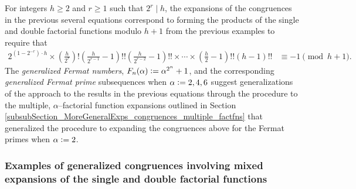 \documentclass[12pt,reqno]{article}
\numberwithin{sfootnote}{section}
\numberwithin{equation}{section}
\theoremstyle{DefaultTheoremStyle}
\theoremstyle{definition}
\newcommand{\defequals}{\ensuremath{\vcentcolon=}}
\begin{document}
For integers $h \geq 2$ and $r \geq 1$ such that $2^{r} \mid h$, the 
expansions of the congruences in the previous several equations correspond to 
forming the products of the single and double factorial functions 
modulo $h+1$ from the previous examples to require that 
\begin{align*} 
2^{\left(1-2^{-r}\right) \cdot h} \times \left(\frac{h}{2^{r}}\right)! 
     \left(\frac{h}{2^{r-1}} -1\right)!! 
     \left(\frac{h}{2^{r-2}} -1\right)!! \times \cdots \times 
     \left(\frac{h}{2} -1\right)!! 
     \left(h -1\right)!! & \equiv -1 \pmod{h+1}. 
\end{align*} 
The \emph{generalized Fermat numbers}, 
$F_n(\alpha) \defequals \alpha^{2^n}+1$, and the corresponding 
\emph{generalized Fermat prime} subsequences 
when $\alpha \defequals 2, 4, 6$ suggest generalizations of the 
approach to the results in the previous equations through the 
procedure to the multiple, $\alpha$--factorial function expansions outlined in 
Section \ref{subsubSection_MoreGeneralExps_congruences_multiple_factfns} 
that generalized the procedure to expanding the congruences above for the 
Fermat primes when $\alpha \defequals 2$. 

\subsubsection{Examples of generalized congruences 
               involving mixed expansions of the 
               single and double factorial functions} 
\end{document}
